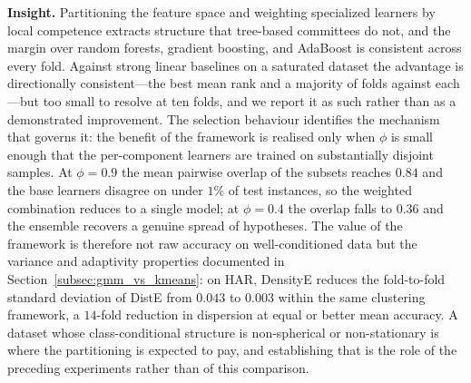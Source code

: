 \documentclass[lettersize,journal]{IEEEtran}
\begin{document}
		\noindent \textbf{Insight.} Partitioning the feature space and weighting specialized learners by local competence extracts structure that tree-based committees do not, and the margin over random forests, gradient boosting, and AdaBoost is consistent across every fold. Against strong linear baselines on a saturated dataset the advantage is directionally consistent---the best mean rank and a majority of folds against each---but too small to resolve at ten folds, and we report it as such rather than as a demonstrated improvement. The selection behaviour identifies the mechanism that governs it: the benefit of the framework is realised only when $\phi$ is small enough that the per-component learners are trained on substantially disjoint samples. At $\phi = 0.9$ the mean pairwise overlap of the subsets reaches $0.84$ and the base learners disagree on under $1\%$ of test instances, so the weighted combination reduces to a single model; at $\phi = 0.4$ the overlap falls to $0.36$ and the ensemble recovers a genuine spread of hypotheses. The value of the framework is therefore not raw accuracy on well-conditioned data but the variance and adaptivity properties documented in Section~\ref{subsec:gmm_vs_kmeans}: on HAR, DensityE reduces the fold-to-fold standard deviation of DistE from $0.043$ to $0.003$ within the same clustering framework, a $14$-fold reduction in dispersion at equal or better mean accuracy. A dataset whose class-conditional structure is non-spherical or non-stationary is where the partitioning is expected to pay, and establishing that is the role of the preceding experiments rather than of this comparison.
\end{document}

